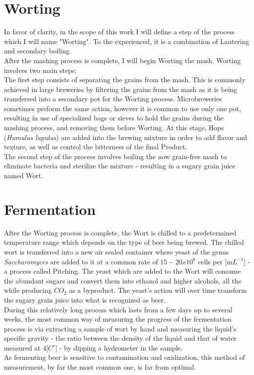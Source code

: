 \documentclass[twoside]{ctuthesis}
\theoremstyle{plain}
\theoremstyle{definition}
\theoremstyle{note}
\begin{document}
\section{Worting}
In favor of clarity, in the scope of this work I will define a step of the process which I will name "Worting". To the experienced, it is a combination of Lautering and secondary boiling.\\
After the mashing process is complete, I will begin Worting the mash. Worting involves two main steps:\\
The first step consists of separating the grains from the mash. This is commonly achieved in large breweries by filtering the grains from the mash as it is being transferred into a secondary pot for the Worting process. Microbreweries sometimes preform the same action, however it is common to use only one pot, resulting in use of specialized bags or sieves to hold the grains during the mashing process, and removing them before Worting. At this stage, Hops (\textit{Humulus lupulus}) are added into the brewing mixture in order to add flavor and texture, as well as control the bitterness of the final Product.\cite{Hops}\\
The second step of the process involves boiling the now grain-free mash to eliminate bacteria and sterilize the mixture - resulting in a sugary grain juice named Wort.

\section{Fermentation}
After the Worting process is complete, the Wort is chilled to a predetermined temperature range which depends on the type of beer being brewed. The chilled wort is transferred into a new air sealed container where yeast of the genus \textit{Saccharomyces} are added to it at a common rate of $15-20 x 10^6$ cells per [m$L^{-1}$] - a process called Pitching. The yeast which are added to the Wort will consume the abundant sugars and convert them into ethanol and higher alcohols, all the while producing $CO_2$ as a byproduct. The yeast's action will over time transform the sugary grain juice into what is recognized as beer.\\
During this relatively long process which lasts from a few days up to several weeks, the most common way of measuring the progress of the fermentation process is via extracting a sample of wort by hand and measuring the liquid's specific gravity - the ratio between the density of the liquid and that of water measured at 4[$C^\circ$] - by dipping a hydrometer in the sample.\\
As fermenting beer is sensitive to contamination and oxidization, this method of measurement, by far the most common one, is far from optimal. \cite{Biochemistry}
\end{document}
